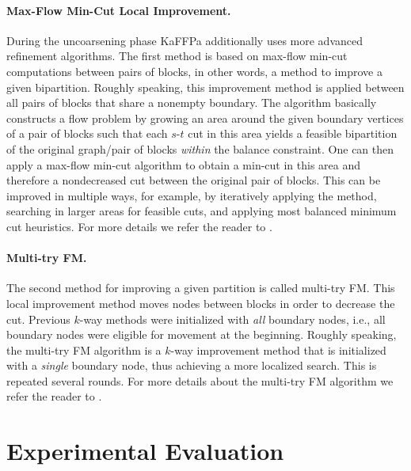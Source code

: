 \documentclass{llncs}
\begin{document}
\paragraph*{Max-Flow Min-Cut Local Improvement.} During the uncoarsening phase KaFFPa additionally uses more advanced refinement algorithms. 
The first method is based on  max-flow min-cut computations between pairs of blocks, in other words, a method to improve a given bipartition. 
Roughly speaking, this improvement method is applied between all pairs of blocks that share a nonempty boundary. 
The algorithm basically constructs a flow problem by growing an area around the given boundary vertices of a pair of blocks such that each $s$-$t$ cut in this area yields a feasible bipartition of the original graph/pair of blocks \textit{within} the balance constraint. 
One can then apply a max-flow min-cut algorithm to obtain a min-cut in this area and therefore a nondecreased cut between the original pair of blocks. 
This can be improved in multiple ways, for example, by iteratively applying the method, searching in larger areas for feasible cuts, and applying most balanced minimum cut heuristics. For more details we refer the reader to \cite{kaffpa}.

\paragraph*{Multi-try FM.} 
The second method for improving a given partition is called multi-try FM. 
This local improvement method moves nodes between blocks in order to decrease the cut. 
Previous $k$-way methods were initialized with \textit{all} boundary nodes, i.e., all boundary nodes were eligible for movement at the beginning.
Roughly speaking, the multi-try FM algorithm is a $k$-way improvement method that is initialized with a \textit{single} boundary node, thus achieving a more localized search. This is repeated several rounds. 
For more details about the multi-try FM algorithm we refer the reader to \cite{kaffpa}. 

\section{Experimental Evaluation}
\label{sec:experiments}
\end{document}
